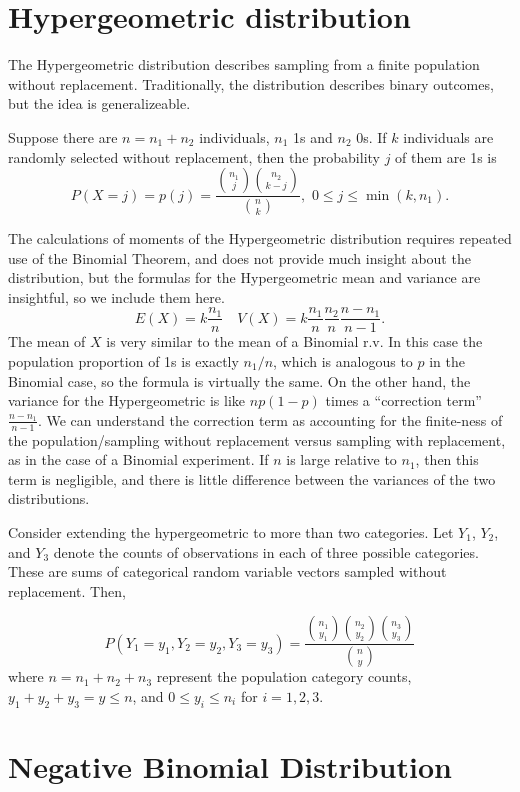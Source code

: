 \documentclass[]{book}
\begin{document}
\section{Hypergeometric distribution}\label{hypergeometric-distribution}

The Hypergeometric distribution describes sampling from a finite
population without replacement. Traditionally, the distribution
describes binary outcomes, but the idea is generalizeable.

Suppose there are \(n = n_1 + n_2\) individuals, \(n_1\) 1s and \(n_2\)
0s. If \(k\) individuals are randomly selected without replacement, then
the probability \(j\) of them are 1s is
\[P(X = j) = p(j) = \frac{{n_1 \choose j}{n_2 \choose k-j}}{{n \choose k}}, \, \, 0\leq j\leq \min(k,n_1).\]

The calculations of moments of the Hypergeometric distribution requires
repeated use of the Binomial Theorem, and does not provide much insight
about the distribution, but the formulas for the Hypergeometric mean and
variance are insightful, so we include them here.
\[E(X) = k\frac{n_1}{n}\quad V(X) = k\frac{n_1}{n}\frac{n_2}{n}\frac{n-n_1}{n-1}.\]
The mean of \(X\) is very similar to the mean of a Binomial r.v. In this
case the population proportion of 1s is exactly \(n_1/n\), which is
analogous to \(p\) in the Binomial case, so the formula is virtually the
same. On the other hand, the variance for the Hypergeometric is like
\(np(1-p)\) times a ``correction term'' \(\frac{n-n_1}{n-1}\). We can
understand the correction term as accounting for the finite-ness of the
population/sampling without replacement versus sampling with
replacement, as in the case of a Binomial experiment. If \(n\) is large
relative to \(n_1\), then this term is negligible, and there is little
difference between the variances of the two distributions.

Consider extending the hypergeometric to more than two categories. Let
\(Y_1\), \(Y_2\), and \(Y_3\) denote the counts of observations in each
of three possible categories. These are sums of categorical random
variable vectors sampled without replacement. Then,

\[P(Y_1 = y_1, Y_2 = y_2, Y_3 = y_3) = \frac{{n_1\choose y_1}{n_2\choose y_2}{n_3\choose y_3}}{{n \choose y}}\]
where \(n = n_1+n_2+n_3\) represent the population category counts,
\(y_1 + y_2 + y_3 = y \leq n\), and \(0\leq y_i\leq n_i\) for
\(i=1,2,3\).

\section{Negative Binomial
Distribution}\label{negative-binomial-distribution}
\end{document}
